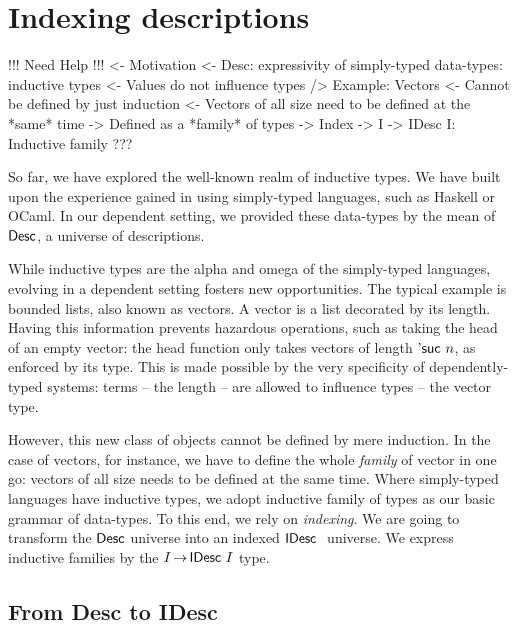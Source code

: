 \section{Indexing descriptions}

\begin{wstructure}
!!! Need Help !!!
<- Motivation
    <- Desc: expressivity of simply-typed data-types: inductive types
        <- Values do not influence types
    /> Example: Vectors
        <- Cannot be defined by just induction
            <- Vectors of all size need to be defined at the *same* time
            -> Defined as a *family* of types
                -> Index
        -> I -> IDesc I: Inductive family
    ???
\end{wstructure}


So far, we have explored the well-known realm of inductive types. We
have built upon the experience gained in using simply-typed languages,
such as Haskell or OCaml. In our dependent setting, we provided these
data-types by the mean of $\Desc$, a universe of descriptions. 

While inductive types are the alpha and omega of the simply-typed
languages, evolving in a dependent setting fosters new
opportunities. The typical example is bounded lists, also known as
vectors. A vector is a list decorated by its length. Having this
information prevents hazardous operations, such as taking the head of
an empty vector: the head function only takes vectors of length
$\NatSuc{n}$, as enforced by its type. This is made possible by the
very specificity of dependently-typed systems: terms -- the length --
are allowed to influence types -- the vector type.

However, this new class of objects cannot be defined by mere
induction. In the case of vectors, for instance, we have to define the
whole \emph{family} of vector in one go: vectors of all size needs to
be defined at the same time. Where simply-typed languages have
inductive types, we adopt inductive family of types as our basic
grammar of data-types. To this end, we rely on \emph{indexing}. We are
going to transform the $\Desc$ universe into an indexed $\IDesc$
universe. We express inductive families by the $I \To \IDesc{I}$ type.


\subsection{From Desc to IDesc}

